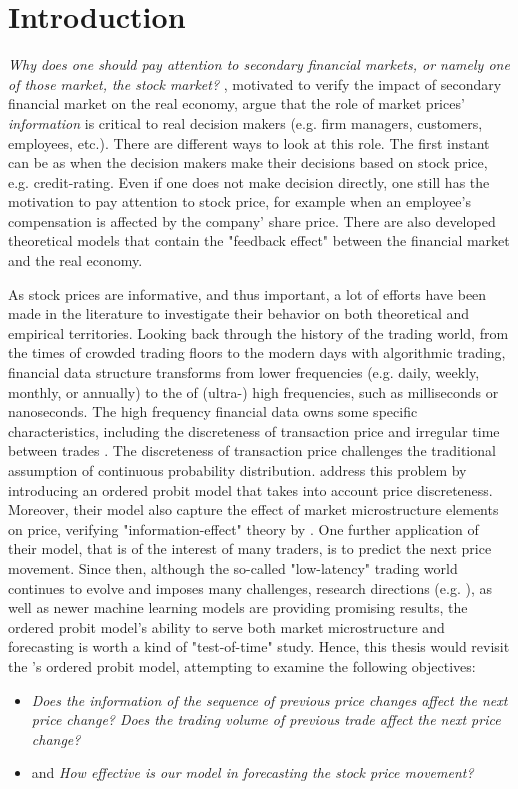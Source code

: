 \chapter{Introduction}\label{chap:introduction}

\textit{Why does one should pay attention to secondary financial markets, or namely one of those market, the stock market?} \citet{bondetal2012}, motivated to verify the impact of secondary financial market on the real economy, argue that the role of market prices' \textit{information} is critical to real decision makers (e.g. firm managers, customers, employees, etc.). There are different ways to look at this role. The first instant can be as when the decision makers make their decisions based on stock price, e.g. credit-rating. Even if one does not make decision directly, one still has the motivation to pay attention to stock price, for example when an employee's compensation is affected by the company' share price. There are also developed theoretical models that contain the "feedback effect" between the financial market and the real economy.

As stock prices are informative, and thus important, a lot of efforts have been made in the literature to investigate their behavior on both theoretical and empirical territories. Looking back through the history of the trading world, from the times of crowded trading floors to the modern days with algorithmic trading, financial data structure transforms from lower frequencies (e.g. daily, weekly, monthly, or annually) to the of (ultra-) high frequencies, such as milliseconds or nanoseconds. The high frequency financial data owns some specific characteristics, including the discreteness of transaction price and irregular time between trades \citep{tsay2013}. The discreteness of transaction price challenges the traditional assumption of continuous probability distribution. \citet{hausman1992} address this problem by introducing an ordered probit model that takes into account price discreteness. Moreover, their model also capture the effect of market microstructure elements on price, verifying "information-effect" theory by \citet{easleyohara1987}. One further application of their model, that is of the interest of many traders, is to predict the next price movement. Since then, although the so-called "low-latency" trading world continues to evolve and imposes many challenges, research directions (e.g. \citet{ohara2015}), as well as newer machine learning models are providing promising results, the ordered probit model's ability to serve both market microstructure and forecasting is worth a kind of "test-of-time" study. Hence, this thesis would revisit the \citet{hausman1992}'s ordered probit model, attempting to examine the following objectives:
\begin{itemize}
    \item \textit{Does the information of the sequence of previous price changes affect the next price change? Does the trading volume of previous trade affect the next price change?}
    \item and \textit{How effective is our model in forecasting the stock price movement?}
\end{itemize}

